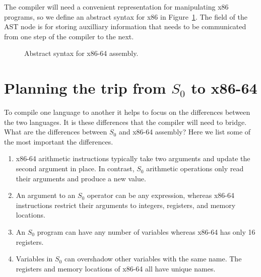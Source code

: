 \documentclass[12pt]{book}
\begin{document}
The compiler will need a convenient representation for manipulating
x86 programs, so we define an abstract syntax for x86 in
Figure~\ref{fig:x86-ast-a}. The  field of the 
AST node is for storing auxilliary information that needs to be
communicated from one step of the compiler to the next. 

\begin{figure}[tbp]
\caption{Abstract syntax for x86-64 assembly.}
\label{fig:x86-ast-a}
\end{figure}

\section{Planning the trip from $S_0$ to x86-64}
\label{sec:plan-s0-x86}

To compile one language to another it helps to focus on the
differences between the two languages. It is these differences that
the compiler will need to bridge. What are the differences between
$S_0$ and x86-64 assembly? Here we list some of the most important the
differences.

\begin{enumerate}
\item x86-64 arithmetic instructions typically take two arguments and
  update the second argument in place. In contrast, $S_0$ arithmetic
  operations only read their arguments and produce a new value.

\item An argument to an $S_0$ operator can be any expression, whereas
  x86-64 instructions restrict their arguments to integers, registers,
  and memory locations.

\item An $S_0$ program can have any number of variables whereas x86-64
  has only 16 registers.

\item Variables in $S_0$ can overshadow other variables with the same
  name. The registers and memory locations of x86-64 all have unique
  names.
\end{enumerate}
\end{document}
